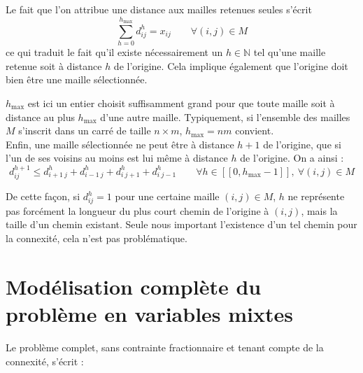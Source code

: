 \documentclass[a4paper,11pt]{article}
\begin{document}
Le fait que l'on attribue une distance aux mailles retenues seules s'écrit
\begin{equation}
\sum_{h=0}^{h_{\max}} d^h_{ij} = x_{ij} \qquad \forall (i,j) \in M
\end{equation}
ce qui traduit le fait qu'il existe nécessairement un $h \in \mathbb{N}$ tel qu'une maille retenue soit à distance $h$ de l'origine. Cela implique également que l'origine doit bien être une maille sélectionnée.

$h_{\max}$ est ici un entier choisit suffisamment grand pour que toute maille soit à distance au plus $h_{\max}$ d'une autre maille. Typiquement, si l'ensemble des mailles $M$ s'inscrit dans un carré de taille $n\times m$, $h_{\max} = n m$ convient.\\


Enfin, une maille sélectionnée ne peut être à distance $h+1$ de l'origine, que si l'un de ses voisins au moins est lui même à distance $h$ de l'origine. On a ainsi :
\begin{equation}
d^{h+1}_{ij} \le d^h_{i+1~j} + d^h_{i-1~j} + d^h_{i~j+1} + d^h_{i~j-1} \qquad \forall h \in [\![ 0, h_{\max}-1 ]\!],~ \forall (i,j) \in M
\end{equation}



De cette façon, si $d^h_{ij} = 1$ pour une certaine maille $(i,j) \in M$, $h$ ne représente pas forcément la longueur du plus court chemin de l'origine à $(i,j)$, mais la taille d'un chemin existant. Seule nous important l'existence d'un tel chemin pour la connexité, cela n'est pas problématique.


\section{Modélisation complète du problème en variables mixtes}



Le problème complet, sans contrainte fractionnaire et tenant compte de la connexité, s'écrit :
\end{document}
